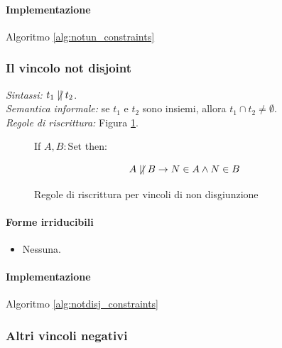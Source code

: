 \documentclass[12pt,a4paper,openright]{book} %
\begin{document}
\paragraph{Implementazione}
Algoritmo \ref{alg:notun_constraints}

\subsubsection{Il vincolo not disjoint}

\textit{Sintassi:} $t_1 \not\mid\mid t_2$.\\
\noindent\textit{Semantica informale:} se $t_1$ e $t_2$ sono insiemi, allora $t_1 \cap t_2 \neq \emptyset$.\\
\noindent\textit{Regole di riscrittura:} Figura \ref{fig:notdisj_constraints}.

\begin{figure}
	\begin{tcolorbox}[colframe=black, colback=white, sharp corners]
		\setcounter{equation}{6}
		\renewcommand{\theequation}{$\mid\mid$\textsubscript{\arabic{equation}}}
		
		If $A, B: \text{Set}$ then:
		
		\begin{equation}
		A \not\mid\mid B \to N \in A \land N \in B
		\end{equation}
		
	\end{tcolorbox}
	
	\caption{Regole di riscrittura per vincoli di non disgiunzione}
	\label{fig:notdisj_constraints}
\end{figure}

\paragraph{Forme irriducibili}
\begin{itemize}
	\item Nessuna.
\end{itemize}

\paragraph{Implementazione}
Algoritmo \ref{alg:notdisj_constraints}

\subsubsection{Altri vincoli negativi}
\end{document}
